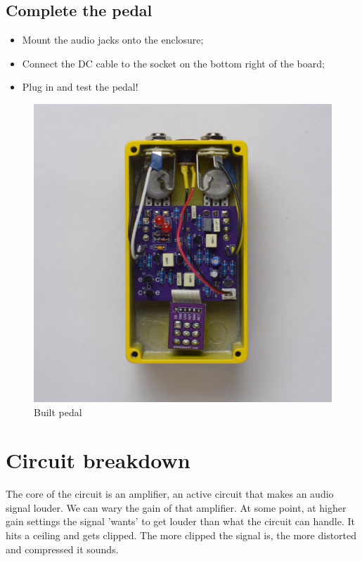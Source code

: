 \documentclass[a4paper,12pt]{article}
\begin{document}
\pagebreak

\subsection{Complete the pedal}

\begin{itemize}
  \item Mount the audio jacks onto the enclosure;
  \item Connect the DC cable to the socket on the bottom
    right of the board;
  \item Plug in and test the pedal!
\end{itemize}


\begin{figure}[h!]
  \begin{center}
    \includegraphics[width=\textwidth]{build/20-built-1000px.jpg}
  \end{center}
  \caption{Built pedal}
\end{figure}

\pagebreak

\section{Circuit breakdown}
\label{sec:circuit}

The core of the circuit is an amplifier, an active circuit
that makes an audio signal louder. We can wary the gain of
that amplifier. At some point, at higher gain settings the
signal 'wants' to get louder than what the circuit can
handle. It hits a ceiling and gets clipped. The more clipped
the signal is, the more distorted and compressed it sounds.
\end{document}

